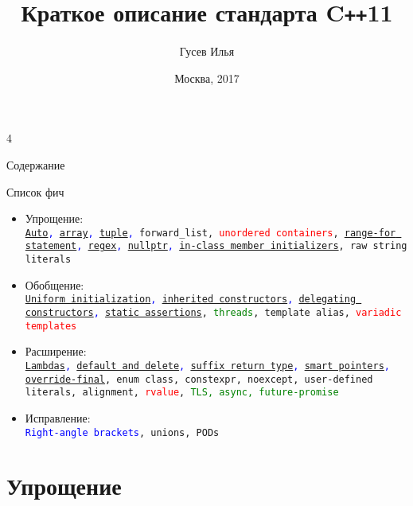 4\documentclass[10pt]{beamer}
\title[\href{https://goo.gl/NRgp8K}{https://goo.gl/NRgp8K} (Term 3)]{Краткое описание стандарта C\texttt{++}11}
\author[Гусев Илья]{Гусев Илья}
\institute[МФТИ] 
{Московский физико-технический институт\\*}
\date{Москва, 2017}
\begin{document}
\begin{frame}
  \titlepage
\end{frame}

\begin{frame}{Содержание}
\begin{multicols}{2}
\tableofcontents
\end{multicols}
\end{frame}

\begin{frame}{Список фич}
\begin{itemize}
\item{Упрощение:\\ \texttt{\textcolor{blue}{\hyperlink{Auto}{Auto}, \hyperlink{Array}{array}, \hyperlink{Tuple}{tuple},} forward\_list, \textcolor{red}{unordered containers}, \textcolor{blue}{\hyperlink{Range-for}{range-for statement}, \hyperlink{Regex}{regex}, \hyperlink{Nullptr}{nullptr}, \hyperlink{In-class member initializers}{in-class member initializers}}, raw string literals }}
\item{Обобщение:\\ \texttt{\textcolor{blue}{\hyperlink{Uniform initialization}{Uniform initialization}, \hyperlink{Inherited constructors}{inherited constructors}, \hyperlink{Delegating constructors}{delegating constructors}, \hyperlink{Static assertions}{static assertions}}, \textcolor{green}{threads}, template alias, \textcolor{red}{variadic templates}}}
\item{Расширение:\\ \texttt{\textcolor{blue}{\hyperlink{Lambdas}{Lambdas}, \hyperlink{Default and delete}{default and delete}, \hyperlink{Suffix return type}{suffix return type}, \hyperlink{Smart pointers}{smart pointers}, \hyperlink{Override-final}{override-final}}, enum class, constexpr, noexcept, user-defined literals, alignment, \textcolor{red}{rvalue}, \textcolor{green}{TLS, async, future-promise}}}
\item{Исправление:\\ \texttt{\textcolor{blue}{Right-angle brackets}, unions, PODs}}
\end{itemize}
\end{frame}

\section{Упрощение}
\end{document}
